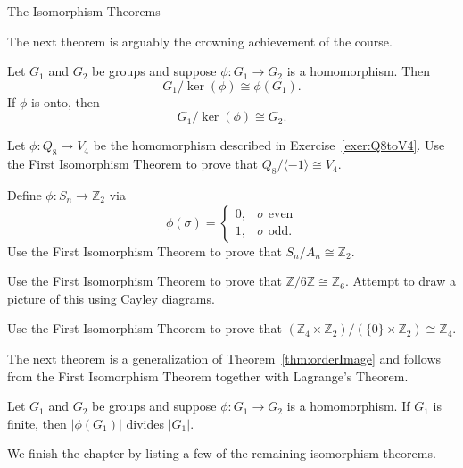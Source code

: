 \begin{section}{The Isomorphism Theorems}

The next theorem is arguably the crowning achievement of the course.

\begin{theorem}
Let $G_1$ and $G_2$ be groups and suppose $\phi:G_1\to G_2$ is a homomorphism. Then
\[
G_1/\ker(\phi)\cong \phi(G_1).
\]
If $\phi$ is onto, then
\[
G_1/\ker(\phi)\cong G_2.
\]
\end{theorem}

\begin{exercise}
Let $\phi:Q_8\to V_4$ be the homomorphism described in Exercise~\ref{exer:Q8toV4}. Use the First Isomorphism Theorem to prove that $Q_8/\langle-1\rangle\cong V_4$.
\end{exercise}

\begin{exercise}
Define $\phi:S_n\to \mathbb{Z}_2$ via
\[
\phi(\sigma)=\begin{cases}
0, & \sigma \text{ even}\\
1, & \sigma \text{ odd}.
\end{cases}
\]
Use the First Isomorphism Theorem to prove that $S_n/A_n\cong \mathbb{Z}_2$.
\end{exercise}

\begin{exercise}
Use the First Isomorphism Theorem to prove that $\mathbb{Z}/6\mathbb{Z}\cong \mathbb{Z}_6$.  Attempt to draw a picture of this using Cayley diagrams.
\end{exercise}

\begin{exercise}
Use the First Isomorphism Theorem to prove that $(\mathbb{Z}_4\times \mathbb{Z}_2)/(\{0\}\times \mathbb{Z}_2)\cong \mathbb{Z}_4$.
\end{exercise}

The next theorem is a generalization of Theorem~\ref{thm:orderImage} and follows from the First Isomorphism Theorem together with Lagrange's Theorem.

\begin{theorem}
Let $G_1$ and $G_2$ be groups and suppose $\phi:G_1\to G_2$ is a homomorphism. If $G_1$ is finite, then $|\phi(G_1)|$ divides $|G_1|$.
\end{theorem}

We finish the chapter by listing a few of the remaining isomorphism theorems.%


\end{section}
